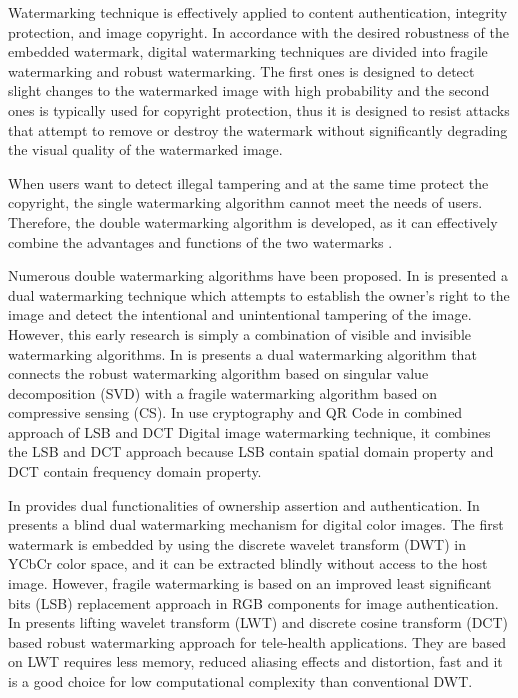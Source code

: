 \documentclass[runningheads]{llncs}
\begin{document}
Watermarking technique is effectively applied to content authentication, integrity protection, and image copyright. In accordance with the desired robustness of the embedded watermark, digital watermarking techniques are divided into fragile watermarking and robust watermarking. The first ones is designed to detect slight changes to the watermarked image with high probability and the second ones is typically used for copyright protection, thus it is designed to resist attacks that attempt to remove or destroy the watermark without significantly degrading the visual quality of the watermarked image.

When users want to detect illegal tampering and at the same time protect the copyright, the single watermarking algorithm cannot meet the needs of users. Therefore, the double watermarking algorithm is developed, as it can effectively combine the advantages and functions of the two watermarks \cite{wang2017dual}.

Numerous double watermarking algorithms have been proposed. In \cite{mohanty1999dual} is presented a dual watermarking technique which attempts to establish the owner’s right to the image and detect the intentional and unintentional tampering of the image. However, this early research is simply a combination of visible and invisible watermarking algorithms. In \cite{wang2017dual} is presents a dual watermarking algorithm that connects the robust watermarking algorithm based on singular value decomposition (SVD) with a fragile watermarking algorithm based on compressive sensing (CS). In \cite{singh2018hybrid} use cryptography and QR Code in combined approach of LSB and DCT Digital image watermarking technique, it combines the LSB and DCT approach because LSB contain spatial domain property and DCT contain frequency domain property.

In \cite{shivani2017dual} provides dual functionalities of ownership assertion and authentication. In \cite{liu2018blind} presents a blind dual watermarking mechanism for digital color images. The first watermark is embedded by using the discrete wavelet transform (DWT) in YCbCr color space, and it can be extracted blindly without access to the host image. However, fragile watermarking is based on an improved least significant bits (LSB) replacement approach in RGB components for image authentication. In \cite{singh2019robust} presents lifting wavelet transform (LWT) and discrete cosine transform (DCT) based robust watermarking approach for tele-health applications. They are based on LWT requires less memory, reduced aliasing effects and distortion, fast and it is a good choice for low computational complexity than conventional DWT.
\end{document}
